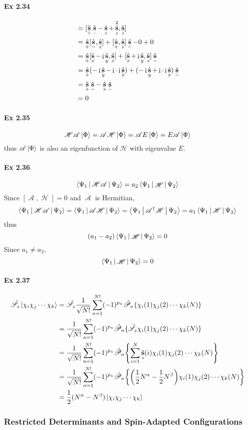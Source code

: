 \documentclass[a4paper]{article}
\DeclareMathOperator{\I}{\mathrm{i}}
\DeclareMathOperator{\hs}{\hat{\vb{s}}}
\DeclareMathOperator{\sH}{\mathscr{H}}
\DeclareMathOperator{\sA}{\mathscr{A}}
\newcommand{\hsP}{\hat{\mathscr{P}}}
\newcommand{\hsS}{\hat{\mathscr{S}}}
\newcommand{\ex}[1]{\paragraph{Ex #1}}
\numberwithin{equation}{subsection}
\begin{document}
\ex{2.34}
\begin{align}
[\hs^2, \hs_z] &= [\hs_+\hs_- - \hs_z + \hs_z^2, \hs_z] \notag\\
&= \hs_+[\hs_-, \hs_z] + [\hs_+, \hs_z]\hs_- - 0 + 0 \notag\\
&= \hs_+[\hs_x - \I\hs_y, \hs_z] + [\hs_x + \I\hs_y, \hs_z]\hs_- \notag\\
&= \hs_+(-\I\hs_y -\I\cdot\I\hs_x) + (-\I\hs_y + \I\cdot\I\hs_x)\hs_- \notag\\
&= \hs_+ \hs_- - \hs_+\hs_- \notag\\
&= 0
\end{align}

\ex{2.35}
\begin{equation}\label{key}
\mathscr{H} \mathscr{A}\ket{\Phi} =  \mathscr{A}\mathscr{H} \ket{\Phi} =  \mathscr{A} E \ket{\Phi} = E\mathscr{A} \ket{\Phi}
\end{equation}
thus $ \mathscr{A} \ket{\Phi} $ is also an eigenfunction of $ \mathscr{H} $ with eigenvalue $ E $.

\ex{2.36}
\begin{equation}\label{key}
\Braket{\Psi_1 | \mathscr{H} \mathscr{A} | \Psi_2} = a_2 \Braket{\Psi_1 | \sH | \Psi_2}
\end{equation}
Since $ [\sA, \sH]=0 $ and $ \sA $ is Hermitian,
\begin{equation}\label{key}
\Braket{\Psi_1 | \mathscr{H} \mathscr{A} | \Psi_2} = \Braket{\Psi_1 | \mathscr{A}\mathscr{H}  | \Psi_2} = \Braket{\Psi_1 | \mathscr{A}^\dagger \mathscr{H}  | \Psi_2} = a_1 \Braket{\Psi_1 | \mathscr{H} | \Psi_2}
\end{equation}
thus
\begin{equation}\label{key}
(a_1 - a_2) \Braket{\Psi_1 | \sH |\Psi_2} = 0
\end{equation}
Since $ a_1 \neq a_2 $,
\begin{equation}\label{key}
\Braket{\Psi_1 | \sH |\Psi_2} = 0
\end{equation}

\ex{2.37}
\begin{align}
\hsS_z \ket{\chi_i\chi_j\cdots\chi_k} &= \hsS_z \dfrac{1}{\sqrt{N!}}\sum_{n=1}^{N!}(-1)^{p_n} \hsP_n\{\chi_i(1)\chi_j(2)\cdots\chi_k(N)\} \notag\\
&= \dfrac{1}{\sqrt{N!}}\sum_{n=1}^{N!}(-1)^{p_n} \hsP_n\{\hsS_z \chi_i(1)\chi_j(2)\cdots\chi_k(N)\} \notag\\
&= \dfrac{1}{\sqrt{N!}}\sum_{n=1}^{N!}(-1)^{p_n} \hsP_n\qty{\sum_{i=1}^{N} \hs_z(i)\chi_i(1)\chi_j(2)\cdots\chi_k(N)} \notag\\
&= \dfrac{1}{\sqrt{N!}}\sum_{n=1}^{N!}(-1)^{p_n} \hsP_n\qty{\qty(\dfrac{1}{2}N^\alpha - \dfrac{1}{2}N^\beta)\chi_i(1)\chi_j(2)\cdots\chi_k(N)} \notag\\
&= \dfrac{1}{2}(N^\alpha - N^\beta) \ket{\chi_i\chi_j\cdots\chi_k} 
\end{align}
\subsubsection{Restricted Determinants and Spin-Adapted Configurations}
\end{document}
